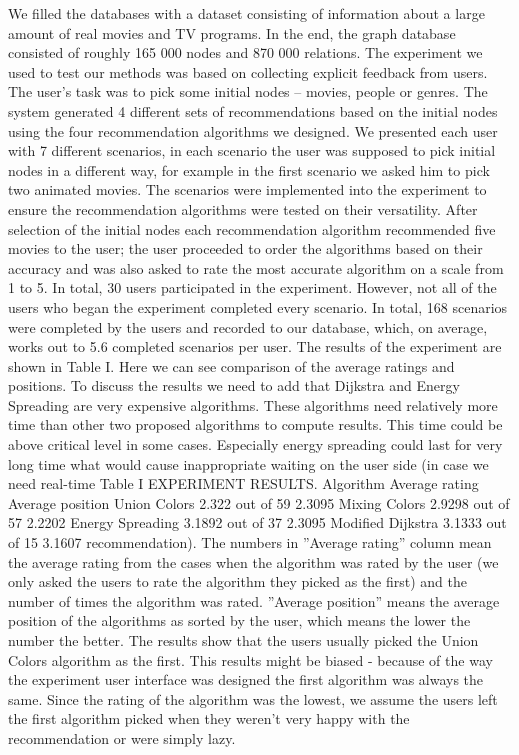 \documentclass[10pt,slovak,a4paper]{article}
\begin{document}
\begin{multicols}{2}
We filled the databases with a dataset consisting of information about a large amount of real movies and TV programs. In the end, the graph database consisted of roughly 165 000 nodes and 870 000 relations.
The experiment we used to test our methods was based on collecting explicit feedback from users. The user’s task was to pick some initial nodes – movies, people or genres. The system generated 4 different sets of recommendations based on the initial nodes using the four recommendation algorithms we designed. We presented each user with 7 different scenarios, in each scenario the user was supposed to pick initial nodes in a different way, for example in the first scenario we asked him to pick two animated movies. The scenarios were implemented into the experiment to ensure the recommendation algorithms were tested on their versatility. After selection of the initial nodes each recommendation algorithm recommended five movies to the user; the user proceeded to order the algorithms based on their accuracy and was also asked to rate the most accurate algorithm on a scale from 1 to 5. In total, 30 users participated in the experiment. However, not all of the users who began the experiment completed every scenario. In total, 168 scenarios were completed by the users and recorded to our database, which, on average, works out to 5.6 completed scenarios per user.
The results of the experiment are shown in Table I. Here we can see comparison of the average ratings and positions. To discuss the results we need to add that Dijkstra and Energy Spreading are very expensive algorithms. These algorithms need relatively more time than other two proposed algorithms to compute results. This time could be above critical level in some cases. Especially energy spreading could last for very long time what would cause inappropriate waiting on the user side (in case we need real-time
Table I EXPERIMENT RESULTS.
Algorithm	Average rating	Average position
Union Colors	2.322 out of 59	2.3095
Mixing Colors	2.9298 out of 57	2.2202
Energy Spreading	3.1892 out of 37	2.3095
Modified Dijkstra	3.1333 out of 15	3.1607
recommendation). The numbers in ”Average rating” column mean the average rating from the cases when the algorithm was rated by the user (we only asked the users to rate the algorithm they picked as the first) and the number of times the algorithm was rated. ”Average position” means the average position of the algorithms as sorted by the user, which means the lower the number the better.
The results show that the users usually picked the Union Colors algorithm as the first. This results might be biased - because of the way the experiment user interface was designed the first algorithm was always the same. Since the rating of the algorithm was the lowest, we assume the users left the first algorithm picked when they weren’t very happy with the recommendation or were simply lazy.

\end{multicols}
\end{document}
